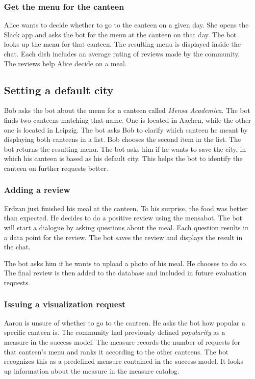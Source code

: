 \subsubsection{Get the menu for the canteen} 
Alice wants to decide whether to go to the canteen on a given day. She opens the Slack app and asks the bot for the menu at the canteen on that day. The bot looks up the menu for that canteen.
The resulting menu is displayed inside the chat. 
Each dish includes an average rating of reviews made by the community. The reviews help Alice decide on a meal.

\subsection{Setting a default city}
Bob asks the bot about the menu for a canteen called \emph{Mensa Academica}. 
The bot finds two canteens matching that name. One is located in Aachen, while the other one is located in Leipzig. 
The bot asks Bob to clarify which canteen he meant by displaying both canteens in a list. Bob chooses the second item in the list. 
The bot returns the resulting menu.
The bot asks him if he wants to save the city, in which his canteen is based as his default city. This helps the bot to identify the canteen on further requests better.

\subsubsection{Adding a review} 
Erdzan just finished his meal at the canteen. To his surprise, the food was better than expected. He decides to do a positive review using the mensabot. 
The bot will start a dialogue by asking questions about the meal. Each question results in a data point for the review. The bot saves the review and displays the result in the chat.

The bot asks him if he wants to upload a photo of his meal. He chooses to do so. The final review is then added to the database and included in future evaluation requests.

\subsubsection{Issuing a visualization request}
Aaron is unsure of whether to go to the canteen. 
He asks the bot how popular a specific canteen is. 
The community had previously defined \emph{popularity} as a measure in the success model. The measure records the number of requests for that canteen's menu and ranks it according to the other canteens.
The bot recognizes this as a predefined measure contained in the success model.
It looks up information about the measure in the measure catalog. 

